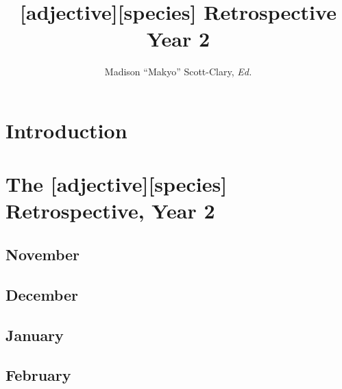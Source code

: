 \documentclass[12pt,letterpaper,oneside]{memoir}
\newcommand\adjsp{
  [adjective][species]
}
\begin{document}
  \title{\adjsp Retrospective Year 2}
  \author{Madison ``Makyo'' Scott-Clary, \textit{Ed.}}
  \maketitle
  \newpage

  \tableofcontents

  \part{Introduction}
  

  \part{The [adjective][species] Retrospective, Year 2}
  \chapter{November}
  
  
  
  
  

  \chapter{December}
  
  
  
  
  
  
  

  \chapter{January}
  
  
  
  
  
  
  

  \chapter{February}
  
  
\end{document}

